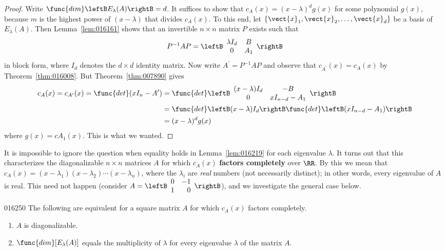\begin{proof}
Write $\func{dim}\leftB E_{\lambda}(A)\rightB = d$. It suffices to show that $c_{A}(x) = (x - \lambda)^{d}g(x)$ for some polynomial $g(x)$, because $m$ is the highest power of $(x - \lambda)$ that divides $c_{A}(x)$. To this end, let $\{\vect{x}_{1}, \vect{x}_{2}, \dots, \vect{x}_{d}\}$ be a basis of $E_{\lambda}(A)$. Then Lemma~\ref{lem:016161} shows that an invertible $n \times n$ matrix $P$ exists such that
\begin{equation*}
P^{-1}AP = 
\leftB \begin{array}{cc}
\lambda I_d & B \\
0 & A_1
\end{array} \rightB
\end{equation*}
in block form, where $I_{d}$ denotes the $d \times d$ identity matrix. Now write $A^\prime = P^{-1}AP$ and observe that $ c_{A^\prime}(x) = c_A(x) $ by Theorem~\ref{thm:016008}. But Theorem~\ref{thm:007890} gives
\begin{align*}
c_A(x) = c_{A^\prime}(x) = \func{det} (xI_n - A^\prime) &= \func{det} 
\leftB \begin{array}{cc}
(x - \lambda)I_d & -B \\
0 & xI_{n-d} - A_1
\end{array} \rightB \\
&= \func{det} \leftB (x - \lambda)I_d\rightB \func{det} \leftB (xI_{n-d} - A_1)\rightB \\
&= (x - \lambda)^dg(x)
\end{align*}
where $g(x) = cA_{1}(x)$. This is what we wanted.
\end{proof}

It is impossible to ignore the question when equality holds in Lemma~\ref{lem:016219} for each eigenvalue $\lambda$. It turns out that this characterizes the diagonalizable $n \times n$ matrices $A$ for which $c_{A}(x)$ \textbf{factors completely} over $\RR$. By this we mean that $c_{A}(x) = (x - \lambda_{1})(x - \lambda_{2}) \cdots (x - \lambda_{n})$, where the $\lambda_{i}$ are \textit{real} numbers (not necessarily distinct); in other words, every eigenvalue of $A$ is real. This need not happen (consider $A = 
\leftB \begin{array}{rr}
0 & -1 \\
1 & 0
\end{array} \rightB$), and we investigate the general case below.

\begin{theorem}{}{016250} %
The following are equivalent for a square matrix $A$ for which $c_{A}(x)$ factors completely.

\begin{enumerate}
\item $A$ is diagonalizable.

\item $\func{dim}[E_{\lambda}(A)]$ equals the multiplicity of $\lambda$ for every eigenvalue $\lambda$ of the matrix $A$.
\end{enumerate}
\end{theorem}

